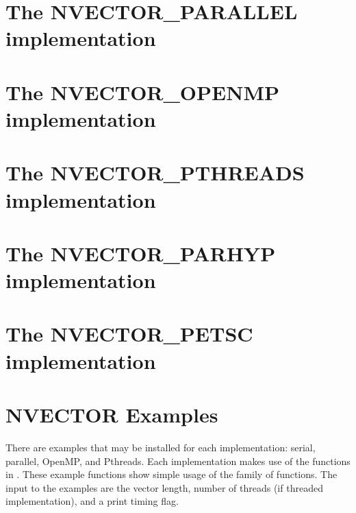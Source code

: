 \section{The NVECTOR\_PARALLEL implementation}\label{ss:nvec_par}


\section{The NVECTOR\_OPENMP implementation}\label{ss:nvec_openmp}


\section{The NVECTOR\_PTHREADS implementation}\label{ss:nvec_pthreads}


\section{The NVECTOR\_PARHYP implementation}\label{ss:nvec_parhyp}


\section{The NVECTOR\_PETSC implementation}\label{ss:nvec_petsc}



\section{NVECTOR Examples}\label{ss:nvec_examples}

There are  examples that may be installed for each
implementation: serial, parallel, OpenMP, and Pthreads.  Each
implementation makes use of the functions in .
These example functions show simple usage of the  family
of functions. The input to the examples are the vector length, number
of threads (if threaded implementation), and a print timing flag.


